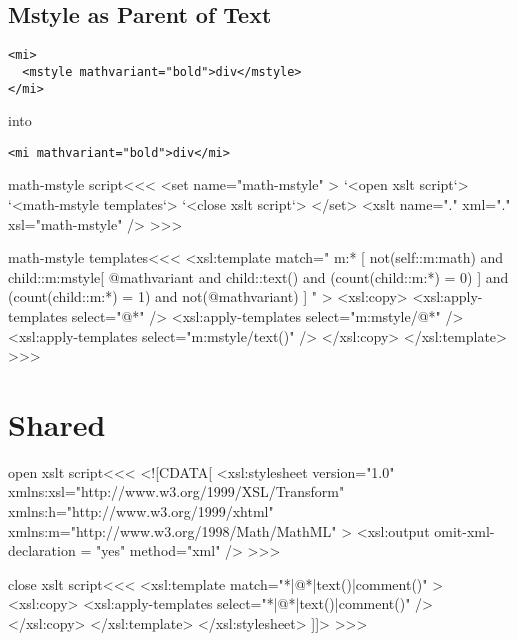 \documentclass{article}
\begin{document}
\subsection{Mstyle as Parent of Text}


\begin{verbatim}
<mi> 
  <mstyle mathvariant="bold">div</mstyle> 
</mi> 
\end{verbatim}

into

\begin{verbatim}
<mi mathvariant="bold">div</mi>
\end{verbatim}

\<math-mstyle script\><<<
<set name="math-mstyle" >
   `<open xslt script`>
   `<math-mstyle templates`>
   `<close xslt script`>
</set>
<xslt name="." xml="." xsl="math-mstyle" />
>>>


\<math-mstyle templates\><<<
<xsl:template match=" m:* [  
      not(self::m:math)
    and
      child::m:mstyle[ 
           @mathvariant
         and
           child::text()
         and
           (count(child::m:*) = 0)    
      ] 
    and
      (count(child::m:*) = 1)    
    and
      not(@mathvariant) 
] " > 
  <xsl:copy>
     <xsl:apply-templates select="@*" /> 
     <xsl:apply-templates select="m:mstyle/@*" /> 
     <xsl:apply-templates select="m:mstyle/text()" /> 
  </xsl:copy>
</xsl:template> 
>>>


\section{Shared}



\<open xslt script\><<<
<![CDATA[ 
   <xsl:stylesheet version="1.0"
      xmlns:xsl="http://www.w3.org/1999/XSL/Transform"
      xmlns:h="http://www.w3.org/1999/xhtml"
      xmlns:m="http://www.w3.org/1998/Math/MathML"
   >
      <xsl:output omit-xml-declaration = "yes" method="xml" />
>>>

\<close xslt script\><<<
      <xsl:template match="*|@*|text()|comment()" >
        <xsl:copy>
          <xsl:apply-templates select="*|@*|text()|comment()" />
        </xsl:copy>
      </xsl:template>
   </xsl:stylesheet> 
]]>
>>>








\end{document}
